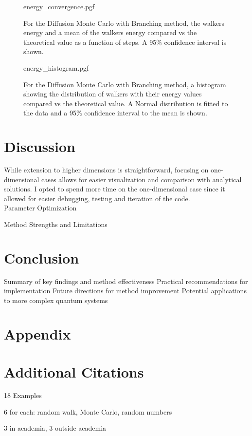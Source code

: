 \documentclass[reqno]{amsart}
\makeatletter
\renewcommand\subsection{\@startsection{subsection}{2}%
  \z@{.5\linespacing\@plus.7\linespacing}{-.5em}%
  {\normalfont\scshape\justify}}
\numberwithin{equation}{section}
\numberwithin{figure}{section}
\makeatother
\begin{document}
\begin{figure}[h]
    \centering
    {energy_convergence.pgf}
    \caption{For the Diffusion Monte Carlo with Branching method, the walkers energy and a mean of the walkers energy compared vs the theoretical value as a function of steps. A 95\% confidence interval is shown.}
    \label{fig:energy_convergence}
\end{figure}

\begin{figure}[h]
    \centering
    {energy_histogram.pgf}
    \caption{For the Diffusion Monte Carlo with Branching method, a histogram showing the distribution of walkers with their energy values compared vs the theoretical value. A Normal distribution is fitted to the data and a 95\% confidence interval to the mean is shown.}
    \label{fig:energy_histogram}
\end{figure}

\section{Discussion}
While extension to higher dimensions is straightforward, focusing on one-dimensional cases allows for easier visualization and comparison with analytical solutions. I opted to spend more time on the one-dimensional case since it allowed for easier debugging, testing and iteration of the code. \\
\subsection{Parameter Optimization}


\subsection{Method Strengths and Limitations}

\section{Conclusion}
Summary of key findings and method effectiveness
Practical recommendations for implementation
Future directions for method improvement
Potential applications to more complex quantum systems

\section*{Appendix}

\appendix
\section{Additional Citations}
18 Examples

6 for each: random walk, Monte Carlo, random numbers

3 in academia, 3 outside academia



\end{document}
